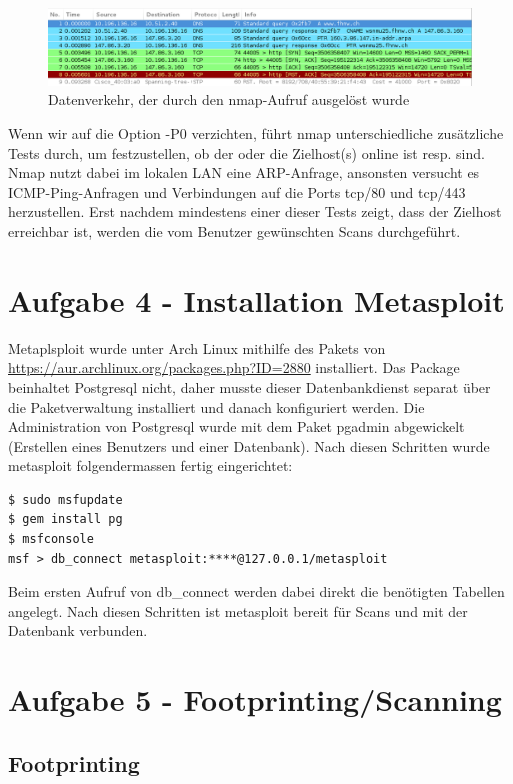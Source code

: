 \documentclass[a4paper,11pt]{scrartcl}
\begin{document}
\begin{figure}[h]
	\centering
	\includegraphics[width=1.0\textwidth]{../aufg3/traffic_nmap-p80.png}
	\caption{Datenverkehr, der durch den nmap-Aufruf ausgelöst wurde}
	\label{fig:traffic_nmap-p80}
\end{figure}

Wenn wir auf die Option -P0 verzichten, führt nmap unterschiedliche zusätzliche Tests durch, um festzustellen, ob der oder die Zielhost(s) online ist resp. sind. Nmap nutzt dabei im lokalen LAN eine ARP-Anfrage, ansonsten versucht es ICMP-Ping-Anfragen und Verbindungen auf die Ports tcp/80 und tcp/443 herzustellen. Erst nachdem mindestens einer dieser Tests zeigt, dass der Zielhost erreichbar ist, werden die vom Benutzer gewünschten Scans durchgeführt.

\newpage
\section{Aufgabe 4 - Installation Metasploit}
Metaplsploit wurde unter Arch Linux mithilfe des Pakets von \url{https://aur.archlinux.org/packages.php?ID=2880} installiert. Das Package beinhaltet Postgresql nicht, daher musste dieser Datenbankdienst separat über die Paketverwaltung installiert und danach konfiguriert werden. Die Administration von Postgresql wurde mit dem Paket pgadmin abgewickelt (Erstellen eines Benutzers und einer Datenbank).
Nach diesen Schritten wurde metasploit folgendermassen fertig eingerichtet:
\begin{lstlisting}
$ sudo msfupdate
$ gem install pg
$ msfconsole
msf > db_connect metasploit:****@127.0.0.1/metasploit
\end{lstlisting}
Beim ersten Aufruf von db\_connect werden dabei direkt die benötigten Tabellen angelegt. Nach diesen Schritten ist metasploit bereit für Scans und mit der Datenbank verbunden.


\FloatBarrier
\newpage
\section{Aufgabe 5 - Footprinting/Scanning}
\subsection{Footprinting}
\end{document}
